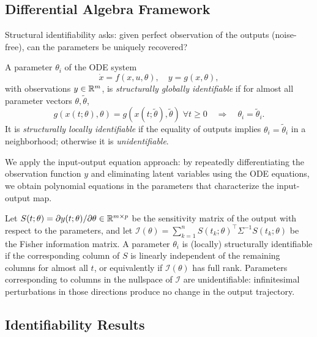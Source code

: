 \subsection{Differential Algebra Framework}

Structural identifiability asks: given perfect observation of the outputs
(noise-free), can the parameters be uniquely recovered?

\begin{definition}
A parameter $\theta_i$ of the ODE system
\[
\dot{x} = f(x, u, \theta),\quad y = g(x, \theta),
\]
with observations $y \in \mathbb{R}^m$, is \emph{structurally globally identifiable}
if for almost all parameter vectors $\theta, \tilde{\theta}$,
\[
g(x(t; \theta), \theta) = g(x(t; \tilde{\theta}), \tilde{\theta}) \;
\forall t \geq 0 \quad\Longrightarrow\quad \theta_i = \tilde{\theta}_i.
\]
It is \emph{structurally locally identifiable} if the equality of outputs
implies $\theta_i = \tilde{\theta}_i$ in a neighborhood; otherwise it is
\emph{unidentifiable}.
\end{definition}

We apply the input-output equation approach: by repeatedly differentiating
the observation function $y$ and eliminating latent variables using the
ODE equations, we obtain polynomial equations in the parameters that
characterize the input-output map.

\begin{definition}
\label{def:sensitivity-rank}
Let $S(t; \theta) = \partial y(t; \theta) / \partial \theta \in \mathbb{R}^{m \times p}$
be the sensitivity matrix of the output with respect to the parameters,
and let $\mathcal{I}(\theta) = \sum_{k=1}^n S(t_k; \theta)^\top
\Sigma^{-1} S(t_k; \theta)$ be the Fisher information matrix. A parameter
$\theta_i$ is (locally) structurally identifiable if the corresponding
column of $S$ is linearly independent of the remaining columns for
almost all $t$, or equivalently if $\mathcal{I}(\theta)$ has full rank.
Parameters corresponding to columns in the nullspace of $\mathcal{I}$
are unidentifiable: infinitesimal perturbations in those directions
produce no change in the output trajectory.
\end{definition}

\subsection{Identifiability Results}


